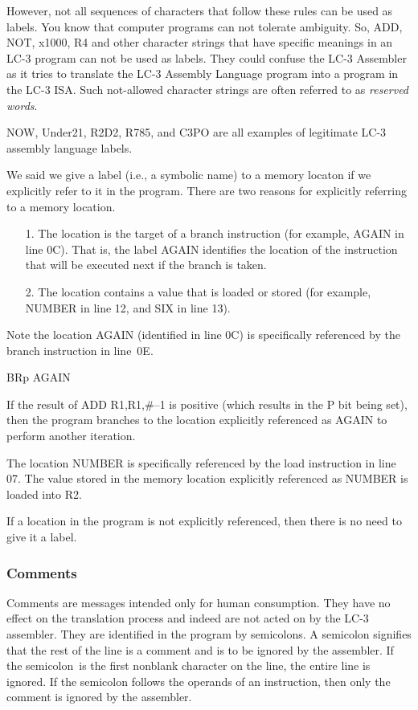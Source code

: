 \documentclass{patt}
\begin{document}
However, not all sequences of characters that follow these rules can be
used as labels.  You know that computer programs can not tolerate
ambiguity.  So, ADD, NOT, x1000, R4 and other character strings 
that have specific meanings in an LC-3 program can not be used as labels. 
They could confuse the LC-3 Assembler as it tries to translate the
LC-3 Assembly Language program into a program in the LC-3 ISA.
Such not-allowed character strings are often referred to 
as {\em reserved words}.

NOW, Under21, R2D2, R785,
and C3PO are all examples of legitimate LC-3 assembly language labels.

We said we give a label (i.e., a symbolic name) to a memory locaton if we 
explicitly refer to it in the program.  There are two reasons for 
explicitly referring to a memory location.

\begin{enumerate}[2.]
\item[1.] The location is the target of a branch instruction
(for example, AGAIN in line 0C).  That is, the label AGAIN identifies the 
location of the instruction that will be executed next if the branch
is taken.  
\item[2.] The location contains a value that is loaded or stored (for
example, NUMBER in line 12, and SIX in line 13).
\end{enumerate}

Note the location AGAIN (identified in line 0C) is specifically 
referenced by the branch instruction in line~0E.

\begin{colorverbatim}
BRp   AGAIN
\end{colorverbatim}

If the result of ADD R1,R1,\#--1 is positive (which results in the 
P bit being set), then the program branches to the location
explicitly referenced as AGAIN to perform another iteration.

The location NUMBER is specifically referenced by the load instruction
in line 07.  The value stored in the memory location explicitly
referenced as NUMBER is loaded into R2.

If a location in the program is not explicitly referenced, then there
is no need to give it a label.  

\subsubsection{Comments}
Comments are messages intended only for human consumption.  They have
 no effect on the translation process and indeed are
not acted on by the LC-3 assembler.  They are identified in the
program by semicolons.  A semicolon signifies that the rest of the
line is a comment and is to be ignored by the assembler.  If the
semicolon~is the first nonblank character on the line, the entire line
is ignored.  If the semicolon follows the operands of an instruction,
then only the comment is ignored by the assembler.
\end{document}
